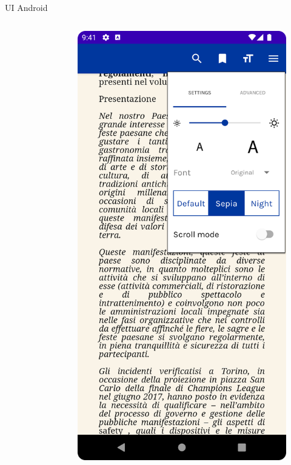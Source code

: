 \begin{frame}{UI Android}
\begin{columns}[onlytextwidth]
\begin{column}{0.24\textwidth}
\begin{figure}[H]
            \end{figure}
        \end{column}
        \begin{column}{0.24\textwidth}
             \begin{figure}[H]
                \includegraphics[width=1\textwidth]{img/reader_settings.png}
            \end{figure}
        \end{column}
    \end{columns}
\end{frame}

